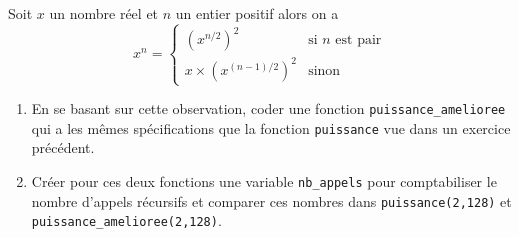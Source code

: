 \documentclass[10pt,firamath,cours]{nsi}
\begin{document}
\begin{exercice}
	Soit $x$ un nombre réel et $n$ un entier positif alors on a \\
	$$x^n=\begin{cases}
			(x^{n/2})^2            & \mbox{si } n \mbox{ est pair} \\
			x\times(x^{(n-1)/2})^2 & \mbox{sinon}
		\end{cases}$$
	\begin{enumerate}
		\item 	En se basant sur cette observation, coder une fonction \texttt{puissance_amelioree} qui a les mêmes spécifications que la fonction \texttt{puissance} vue dans un exercice précédent.
		\item 	Créer pour ces deux fonctions une variable \texttt{nb_appels} pour comptabiliser le nombre d'appels récursifs et comparer ces nombres dans \texttt{puissance(2,128)} et \texttt{puissance_amelioree(2,128)}.
	\end{enumerate}
\end{exercice}
\end{document}
